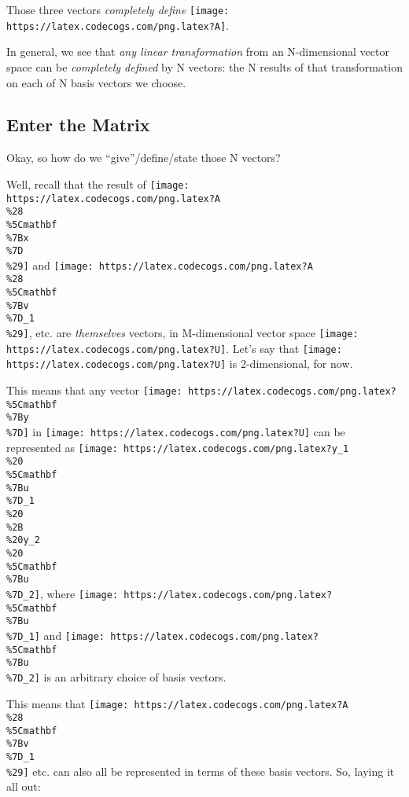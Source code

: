 \documentclass[]{article}
\begin{document}
Those three vectors \emph{completely define}
\texttt{[image: https://latex.codecogs.com/png.latex?A]}.

In general, we see that \emph{any linear transformation} from an N-dimensional
vector space can be \emph{completely defined} by N vectors: the N results of
that transformation on each of N basis vectors we choose.

\hypertarget{enter-the-matrix}{%
\subsection{Enter the Matrix}\label{enter-the-matrix}}

Okay, so how do we ``give''/define/state those N vectors?

Well, recall that the result of
\texttt{[image: https://latex.codecogs.com/png.latex?A\\\%28\\\%5Cmathbf\\\%7Bx\\\%7D\\\%29]}
and
\texttt{[image: https://latex.codecogs.com/png.latex?A\\\%28\\\%5Cmathbf\\\%7Bv\\\%7D\_1\\\%29]},
etc. are \emph{themselves} vectors, in M-dimensional vector space
\texttt{[image: https://latex.codecogs.com/png.latex?U]}. Let's say that
\texttt{[image: https://latex.codecogs.com/png.latex?U]} is 2-dimensional, for
now.

This means that any vector
\texttt{[image: https://latex.codecogs.com/png.latex?\\\%5Cmathbf\\\%7By\\\%7D]} in
\texttt{[image: https://latex.codecogs.com/png.latex?U]} can be represented as
\texttt{[image: https://latex.codecogs.com/png.latex?y\_1\\\%20\\\%5Cmathbf\\\%7Bu\\\%7D\_1\\\%20\\\%2B\\\%20y\_2\\\%20\\\%5Cmathbf\\\%7Bu\\\%7D\_2]},
where
\texttt{[image: https://latex.codecogs.com/png.latex?\\\%5Cmathbf\\\%7Bu\\\%7D\_1]} and
\texttt{[image: https://latex.codecogs.com/png.latex?\\\%5Cmathbf\\\%7Bu\\\%7D\_2]} is
an arbitrary choice of basis vectors.

This means that
\texttt{[image: https://latex.codecogs.com/png.latex?A\\\%28\\\%5Cmathbf\\\%7Bv\\\%7D\_1\\\%29]}
etc. can also all be represented in terms of these basis vectors. So, laying it
all out:
\end{document}
